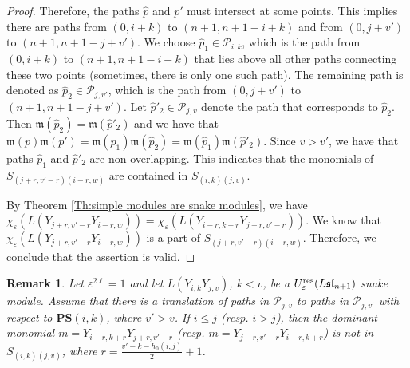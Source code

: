 \documentclass[12pt, reqno]{amsart}
\newtheorem{remark}[theorem]{Remark}
\numberwithin{equation}{section}
\newcommand{\res}{{\rm res}}
\begin{document}
{\begin{proof}
Therefore, the paths $\hat{p}$ and $p'$ must intersect at some points. This implies there are paths from $(0,i+k)$ to $(n+1,n+1-i+k)$ and from $(0,j+v')$ to $(n+1,n+1-j+v')$. We choose $\hat{p}_1 \in\mathscr{P}_{i,k}$, which is the path from $(0,i+k)$ to $(n+1,n+1-i+k)$ that lies above all other paths connecting these two points (sometimes, there is only one such path). The remaining path is denoted as $\hat{p}_2\in\mathscr{P}_{j,v'}$, which is the path from $(0,j+v')$ to $(n+1,n+1-j+v')$. Let $\hat{p}'_2\in\mathscr{P}_{j,v}$ denote the path that corresponds to $\hat{p}_2$. Then $\mathfrak{m}(\hat{p}_2)=\mathfrak{m}(\hat{p}'_2)$ and we have that $\mathfrak{m}(p)\mathfrak{m}(p')=\mathfrak{m}(\hat{p}_1)\mathfrak{m}(\hat{p}_2)=\mathfrak{m}(\hat{p}_1)\mathfrak{m}(\hat{p}'_2)$. Since $v>v'$, we have that paths $\hat{p}_1$ and $\hat{p}'_2$ are non-overlapping. This indicates that the monomials of $S_{(j+r,v'-r)(i-r,w)}$ are contained in $S_{(i,k)(j,v)}$.


By Theorem \ref{Th:simple modules are snake modules}, we have $\chi_\varepsilon(L(Y_{j+r,v'-r}Y_{i-r,w}))=\chi_\varepsilon(L(Y_{i-r,k+r}Y_{j+r,v'-r}))$. We know that $\chi_\varepsilon(L(Y_{j+r,v'-r}Y_{i-r,w}))$ is a part of $S_{(j+r,v'-r)(i-r,w)}$. Therefore, we conclude that the assertion is valid.
\end{proof}



\begin{remark}\label{R: I type greater}
Let $\varepsilon^{2 \ell}=1$ and let $L(Y_{i,k}Y_{j,v})$, $k<v$, be a $U_{\varepsilon}^{\res}({L\mathfrak{sl}_{n+1}})$ snake module. Assume that there is a translation of paths in $\mathscr{P}_{j,v}$ to paths in $\mathscr{P}_{j,v'}$ with respect to $\mathbf{PS}(i,k)$, where $v'> v$. If $i\leq j$ (resp. $i>j$), then the dominant monomial $m=Y_{i-r,k+r}Y_{j+r,v'-r}$ (resp. $m=Y_{j-r,v'-r}Y_{i+r,k+r}$) is not in $S_{(i,k)(j,v)}$, where $r=\frac{v'-k-h_0(i,j)}2+1$.
\end{remark}



}
\end{document}
